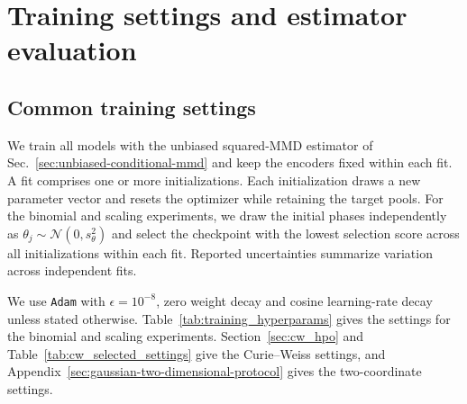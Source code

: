 \documentclass[pra,aps,10pt,twocolumn,floatfix,superscriptaddress, notitlepage,longbibliography]{revtex4-2}
\begin{document}
\clearpage
\onecolumngrid
\appendix
\newcommand{\hpCell}[2]{\parbox[t]{#1}{\raggedright #2\strut}}
\raggedbottom

\section{Training settings and estimator evaluation}
\label{sec:appendix_hyperparams}

\subsection{Common training settings}

We train all models with the unbiased squared-MMD estimator of Sec.~\ref{sec:unbiased-conditional-mmd} and keep the encoders fixed within each fit. A fit comprises one or more initializations. Each initialization draws a new parameter vector and resets the optimizer while retaining the target pools. For the binomial and scaling experiments, we draw the initial phases independently as $\theta_j\sim\mathcal N(0,s_\theta^2)$ and select the checkpoint with the lowest selection score across all initializations within each fit. Reported uncertainties summarize variation across independent fits.

We use \texttt{Adam} \cite{kingmaAdam2015} with $\epsilon=10^{-8}$, zero weight decay and cosine learning-rate decay unless stated otherwise. Table~\ref{tab:training_hyperparams} gives the settings for the binomial and scaling experiments. Section~\ref{sec:cw_hpo} and Table~\ref{tab:cw_selected_settings} give the Curie--Weiss settings, and Appendix~\ref{sec:gaussian-two-dimensional-protocol} gives the two-coordinate settings.
\end{document}
